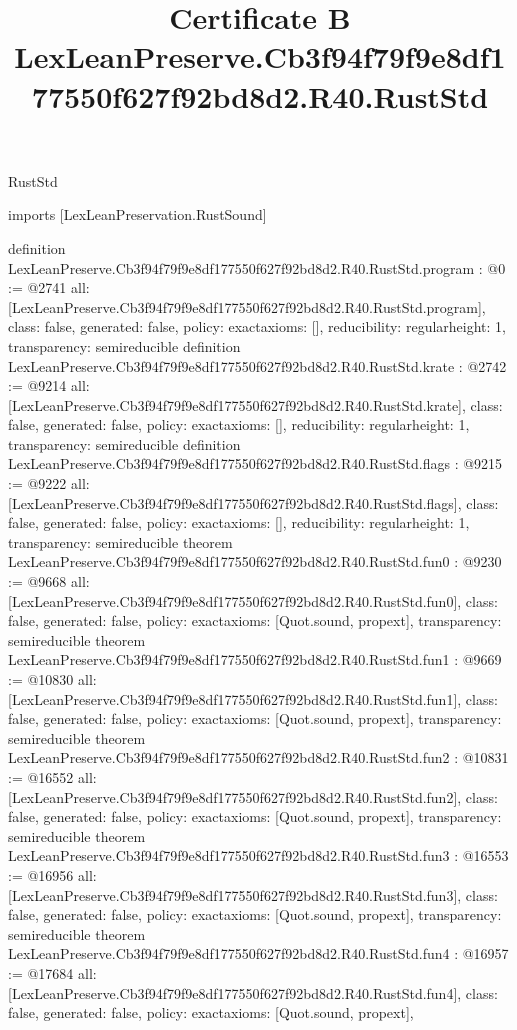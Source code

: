 \begin{lexlean}{RustStd}
\title{Certificate B LexLeanPreserve.Cb3f94f79f9e8df177550f627f92bd8d2.R40.RustStd}
\begin{coremodule}
imports [LexLeanPreservation.RustSound]

definition LexLeanPreserve.Cb3f94f79f9e8df177550f627f92bd8d2.R40.RustStd.program : @0 := @2741 {
  all: [LexLeanPreserve.Cb3f94f79f9e8df177550f627f92bd8d2.R40.RustStd.program],
  class: false,
  generated: false,
  policy: exact{axioms: []},
  reducibility: regular{height: 1},
  transparency: semireducible
}
definition LexLeanPreserve.Cb3f94f79f9e8df177550f627f92bd8d2.R40.RustStd.krate : @2742 := @9214 {
  all: [LexLeanPreserve.Cb3f94f79f9e8df177550f627f92bd8d2.R40.RustStd.krate],
  class: false,
  generated: false,
  policy: exact{axioms: []},
  reducibility: regular{height: 1},
  transparency: semireducible
}
definition LexLeanPreserve.Cb3f94f79f9e8df177550f627f92bd8d2.R40.RustStd.flags : @9215 := @9222 {
  all: [LexLeanPreserve.Cb3f94f79f9e8df177550f627f92bd8d2.R40.RustStd.flags],
  class: false,
  generated: false,
  policy: exact{axioms: []},
  reducibility: regular{height: 1},
  transparency: semireducible
}
theorem LexLeanPreserve.Cb3f94f79f9e8df177550f627f92bd8d2.R40.RustStd.fun0 : @9230 := @9668 {
  all: [LexLeanPreserve.Cb3f94f79f9e8df177550f627f92bd8d2.R40.RustStd.fun0],
  class: false,
  generated: false,
  policy: exact{axioms: [Quot.sound, propext]},
  transparency: semireducible
}
theorem LexLeanPreserve.Cb3f94f79f9e8df177550f627f92bd8d2.R40.RustStd.fun1 : @9669 := @10830 {
  all: [LexLeanPreserve.Cb3f94f79f9e8df177550f627f92bd8d2.R40.RustStd.fun1],
  class: false,
  generated: false,
  policy: exact{axioms: [Quot.sound, propext]},
  transparency: semireducible
}
theorem LexLeanPreserve.Cb3f94f79f9e8df177550f627f92bd8d2.R40.RustStd.fun2 : @10831 := @16552 {
  all: [LexLeanPreserve.Cb3f94f79f9e8df177550f627f92bd8d2.R40.RustStd.fun2],
  class: false,
  generated: false,
  policy: exact{axioms: [Quot.sound, propext]},
  transparency: semireducible
}
theorem LexLeanPreserve.Cb3f94f79f9e8df177550f627f92bd8d2.R40.RustStd.fun3 : @16553 := @16956 {
  all: [LexLeanPreserve.Cb3f94f79f9e8df177550f627f92bd8d2.R40.RustStd.fun3],
  class: false,
  generated: false,
  policy: exact{axioms: [Quot.sound, propext]},
  transparency: semireducible
}
theorem LexLeanPreserve.Cb3f94f79f9e8df177550f627f92bd8d2.R40.RustStd.fun4 : @16957 := @17684 {
  all: [LexLeanPreserve.Cb3f94f79f9e8df177550f627f92bd8d2.R40.RustStd.fun4],
  class: false,
  generated: false,
  policy: exact{axioms: [Quot.sound, propext]},
}
\end{coremodule}
\end{lexlean}
